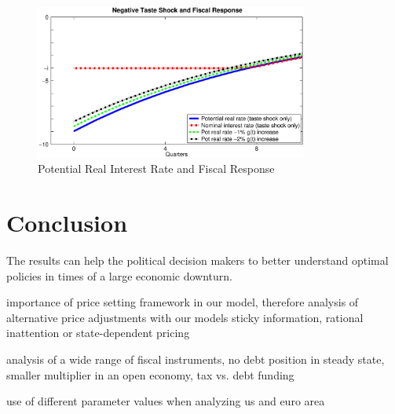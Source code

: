 \documentclass[12pt,a4paper,oneside,titlepage]{article}
\begin{document}
\begin{figure}[!th]
\centering
\includegraphics[width=0.8\textwidth]{Paperpics/Figure1a}
\caption{Potential Real Interest Rate and Fiscal Response}
\label{Figure1a}
\end{figure}








\section{Conclusion}
The results can help the political decision makers to better understand optimal policies in times of a large economic downturn.

importance of price setting framework in our model, therefore analysis of  alternative price adjustments with our models  sticky information, rational inattention or state-dependent pricing

analysis of a wide range of fiscal instruments, no debt position in steady state,  smaller multiplier in an open economy, tax vs. debt funding

use of different parameter values when analyzing us and euro area



\pagebreak[4]




\newpage
\end{document}
